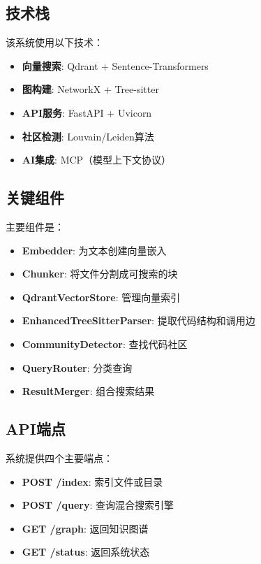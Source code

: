 \documentclass[11pt]{article}
\begin{document}
\subsection{技术栈}
该系统使用以下技术：

\begin{itemize}
    \item \textbf{向量搜索}: Qdrant + Sentence-Transformers
    \item \textbf{图构建}: NetworkX + Tree-sitter
    \item \textbf{API服务}: FastAPI + Uvicorn
    \item \textbf{社区检测}: Louvain/Leiden算法
    \item \textbf{AI集成}: MCP（模型上下文协议）
\end{itemize}

\subsection{关键组件}

主要组件是：

\begin{itemize}
    \item \textbf{Embedder}: 为文本创建向量嵌入
    \item \textbf{Chunker}: 将文件分割成可搜索的块
    \item \textbf{QdrantVectorStore}: 管理向量索引
    \item \textbf{EnhancedTreeSitterParser}: 提取代码结构和调用边
    \item \textbf{CommunityDetector}: 查找代码社区
    \item \textbf{QueryRouter}: 分类查询
    \item \textbf{ResultMerger}: 组合搜索结果
\end{itemize}

\subsection{API端点}

系统提供四个主要端点：

\begin{itemize}
    \item \textbf{POST /index}: 索引文件或目录
    \item \textbf{POST /query}: 查询混合搜索引擎
    \item \textbf{GET /graph}: 返回知识图谱
    \item \textbf{GET /status}: 返回系统状态
\end{itemize}
\end{document}
